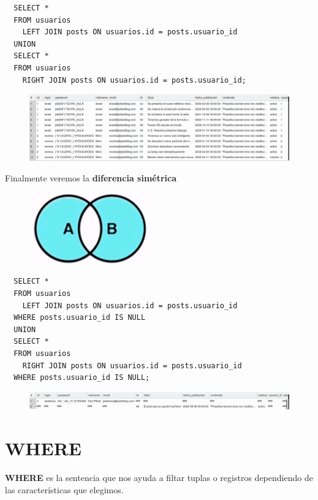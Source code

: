 \documentclass{article}
\begin{document}
\begin{verbatim}
  SELECT *
  FROM usuarios
    LEFT JOIN posts ON usuarios.id = posts.usuario_id
  UNION
  SELECT *
  FROM usuarios
    RIGHT JOIN posts ON usuarios.id = posts.usuario_id;
\end{verbatim}

\newpage

\begin{figure}[h!]
  \centering
  \includegraphics[scale=0.5]{./Pictures/100_union.png}
\end{figure}

Finalmente veremos la \textbf{diferencia simétrica}\\

\begin{figure}[h!]
  \centering
  \includegraphics[scale=0.75]{./Pictures/101_dif_simetrica_euler.png}
\end{figure}

\begin{verbatim}
  SELECT *
  FROM usuarios
    LEFT JOIN posts ON usuarios.id = posts.usuario_id
  WHERE posts.usuario_id IS NULL
  UNION
  SELECT *
  FROM usuarios
    RIGHT JOIN posts ON usuarios.id = posts.usuario_id
  WHERE posts.usuario_id IS NULL;
\end{verbatim}

\begin{figure}[h!]
  \centering
  \includegraphics[scale=0.5]{./Pictures/101_dif_simetrica.png}
\end{figure}



\newpage

\section{WHERE}%
\textbf{WHERE} es la sentencia que nos ayuda a filtar tuplas o registros
dependiendo de las características que elegimos.
\end{document}
